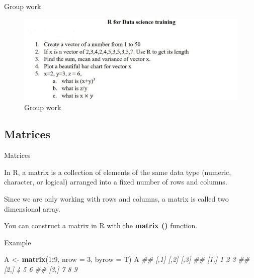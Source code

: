 \documentclass[
  ignorenonframetext,
]{beamer}
\newenvironment{Shaded}{\begin{snugshade}}{\end{snugshade}}
\newcommand{\CommentTok}[1]{\textcolor[rgb]{0.56,0.35,0.01}{\textit{#1}}}
\newcommand{\DataTypeTok}[1]{\textcolor[rgb]{0.13,0.29,0.53}{#1}}
\newcommand{\DecValTok}[1]{\textcolor[rgb]{0.00,0.00,0.81}{#1}}
\newcommand{\KeywordTok}[1]{\textcolor[rgb]{0.13,0.29,0.53}{\textbf{#1}}}
\newcommand{\NormalTok}[1]{#1}
\newcommand{\OperatorTok}[1]{\textcolor[rgb]{0.81,0.36,0.00}{\textbf{#1}}}
\newcommand{\StringTok}[1]{\textcolor[rgb]{0.31,0.60,0.02}{#1}}
\begin{document}
\begin{frame}{Group work}
\protect\hypertarget{group-work}{}

\begin{figure}
\centering
\includegraphics{Images/assignment_Capture.JPG}
\caption{Group work}
\end{figure}

\end{frame}


\subsection{Matrices}

\begin{frame}[fragile]{Matrices}
\protect\hypertarget{matrices}{}

In R, a matrix is a collection of elements of the same data type
(numeric, character, or logical) arranged into a fixed number of rows
and columns.

Since we are only working with rows and columns, a matrix is called two
dimensional array.

You can construct a matrix in R with the \textbf{matrix ()} function.

\begin{block}{Example}

\begin{Shaded}
\begin{Highlighting}[]
\NormalTok{A <-}\StringTok{ }\KeywordTok{matrix}\NormalTok{(}\DecValTok{1}\OperatorTok{:}\DecValTok{9}\NormalTok{, }\DataTypeTok{nrow =} \DecValTok{3}\NormalTok{, }\DataTypeTok{byrow =}\NormalTok{ T)}
\NormalTok{A}
\CommentTok{##      [,1] [,2] [,3]}
\CommentTok{## [1,]    1    2    3}
\CommentTok{## [2,]    4    5    6}
\CommentTok{## [3,]    7    8    9}
\end{Highlighting}
\end{Shaded}

\end{block}

\end{frame}
\end{document}
